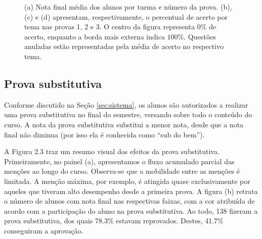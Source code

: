 \documentclass[a4paper]{report}
\begin{document}
\begin{figure}[!h]
    \caption{\small (a) Nota final média dos alunos por turma e número da prova. (b), (c) e (d) apresentam, respectivamente, o percentual de acerto por tema nas provas 1, 2 e 3. O centro da figura representa $0\%$ de acerto, enquanto a borda mais externa indica $100\%$. Questões anuladas estão representadas pela média de acerto no respectivo tema.
}
    \label{fig:notas.medias}
\end{figure}

\subsection{Prova substitutiva}

Conforme discutido na Seção \ref{sec:sistema}, os alunos são autorizados
a realizar uma prova substitutiva no final do semestre, versando sobre
todo o conteúdo do curso. A nota da prova substitutiva substitui a menor
nota, desde que a nota final não diminua (por isso ela é conhecida como
``sub do bem'').

A Figura 2.3 traz um resumo visual dos efeitos da prova substitutiva.
Primeiramente, no painel (a), apresentamos o fluxo acumulado parcial das
menções ao longo do curso. Observa-se que a mobilidade entre as menções
é limitada. A menção máxima, por exemplo, é atingida quase
exclusivamente por aqueles que tiveram alto desempenho desde a primeira
prova. A figura (b) retrata o número de alunos com nota final nas
respectivas faixas, com a cor atribuída de acordo com a participação do
aluno na prova substitutiva. Ao todo, 138 fizeram a prova substitutiva,
dos quais 78.3\(\%\) estavam reprovados. Destes, 41.7\(\%\) conseguiram
a aprovação.
\end{document}
